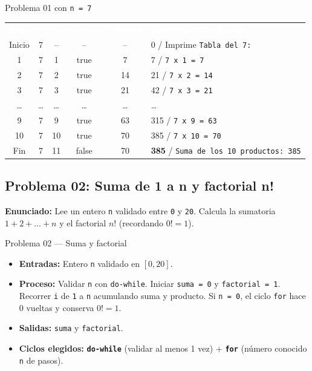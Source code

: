 \documentclass[11pt,letterpaper]{article}
\begin{document}
\begin{pruebaescritorio}{Problema 01 con \texttt{n = 7}}
\begin{center}
\footnotesize
\setlength{\tabcolsep}{4pt}
\renewcommand{\arraystretch}{1.15}
\begin{tabularx}{\linewidth}{c c c c c X}
\rowcolor{AzulMarino}
\textcolor{white}{\textbf{Paso}} & \textcolor{white}{\texttt{n}} & \textcolor{white}{\texttt{i}} & \textcolor{white}{\texttt{i <= 10}} & \textcolor{white}{\texttt{producto}} & \textcolor{white}{\textbf{\texttt{sumaProductos} / Salida}} \\
Inicio & 7 & -- & -- & -- & 0 / Imprime \texttt{Tabla del 7:} \\
1 & 7 & 1 & true & 7 & 7 / \texttt{7 x 1 = 7} \\
2 & 7 & 2 & true & 14 & 21 / \texttt{7 x 2 = 14} \\
3 & 7 & 3 & true & 21 & 42 / \texttt{7 x 3 = 21} \\
\dots & \dots & \dots & \dots & \dots & \dots \\
9 & 7 & 9 & true & 63 & 315 / \texttt{7 x 9 = 63} \\
10 & 7 & 10 & true & 70 & 385 / \texttt{7 x 10 = 70} \\
Fin & 7 & 11 & false & 70 & \textbf{385} / \texttt{Suma de los 10 productos: 385} \\
\bottomrule
\end{tabularx}
\end{center}
\end{pruebaescritorio}

\subsection{Problema 02: Suma de 1 a n y factorial n!}

\textbf{Enunciado:} Lee un entero \texttt{n} validado entre \texttt{0} y \texttt{20}. Calcula la sumatoria $1 + 2 + \dots + n$ y el factorial $n!$ (recordando $0! = 1$).

\begin{analisis}{Problema 02 --- Suma y factorial}
\begin{itemize}
  \item \textbf{Entradas:} Entero \texttt{n} validado en $[0, 20]$.
  \item \textbf{Proceso:} Validar \texttt{n} con \texttt{do-while}. Iniciar \texttt{suma = 0} y \texttt{factorial = 1}. Recorrer \texttt{i} de \texttt{1} a \texttt{n} acumulando suma y producto. Si \texttt{n = 0}, el ciclo \texttt{for} hace 0 vueltas y conserva $0! = 1$.
  \item \textbf{Salidas:} \texttt{suma} y \texttt{factorial}.
  \item \textbf{Ciclos elegidos:} \textbf{\texttt{do-while}} (validar al menos 1 vez) + \textbf{\texttt{for}} (número conocido \texttt{n} de pasos).
\end{itemize}
\end{analisis}
\end{document}
